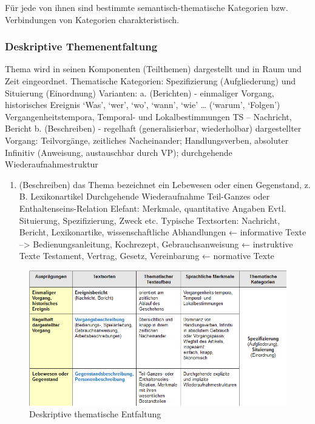 \documentclass[
  letterpaper,
]{scrbook}
\providecommand{\tightlist}{%
  \setlength{\itemsep}{0pt}\setlength{\parskip}{0pt}}\usepackage{longtable,booktabs,array}
\begin{document}
Für jede von ihnen sind bestimmte semantisch-thematische Kategorien bzw.
Verbindungen von Kategorien charakteristisch.

\hypertarget{deskriptive-themenentfaltung}{%
\subsubsection{Deskriptive
Themenentfaltung}\label{deskriptive-themenentfaltung}}

Thema wird in seinen Komponenten (Teilthemen) dargestellt und in Raum
und Zeit eingeordnet. Thematische Kategorien: Spezifizierung
(Aufgliederung) und Situierung (Einordnung) Varianten: a. (Berichten) -
einmaliger Vorgang, historisches Ereignis `Was', `wer', `wo', `wann',
`wie' \ldots{} (`warum', `Folgen') Vergangenheitstempora, Temporal- und
Lokalbestimmungen TS -- Nachricht, Bericht b. (Beschreiben) - regelhaft
(generalisierbar, wiederholbar) dargestellter Vorgang: Teilvorgänge,
zeitliches Nacheinander; Handlungsverben, absoluter Infinitiv
(Anweisung, austauschbar durch VP); durchgehende Wiederaufnahmestruktur

\begin{enumerate}
\def\labelenumi{\alph{enumi}.}
\setcounter{enumi}{2}
\tightlist
\item
  (Beschreiben) das Thema bezeichnet ein Lebewesen oder einen
  Gegenstand, z. B. Lexikonartikel Durchgehende Wiederaufnahme
  Teil-Ganzes oder Enthaltenseins-Relation Elefant: Merkmale,
  quantitative Angaben Evtl. Situierung, Spezifizierung, Zweck etc.
  Typische Textsorten: Nachricht, Bericht, Lexikonartike,
  wissenschaftliche Abhandlungen ← informative Texte --\textgreater{}
  Bedienungsanleitung, Kochrezept, Gebrauchsanweisung ← instruktive
  Texte Testament, Vertrag, Gesetz, Vereinbarung ← normative Texte
\end{enumerate}

\begin{figure}

{\centering \includegraphics[width=1\textwidth,height=\textheight]{./pictures/Themenentfaltung_deskriptive.png}

}

\caption{Deskriptive thematische Entfaltung}

\end{figure}
\end{document}
